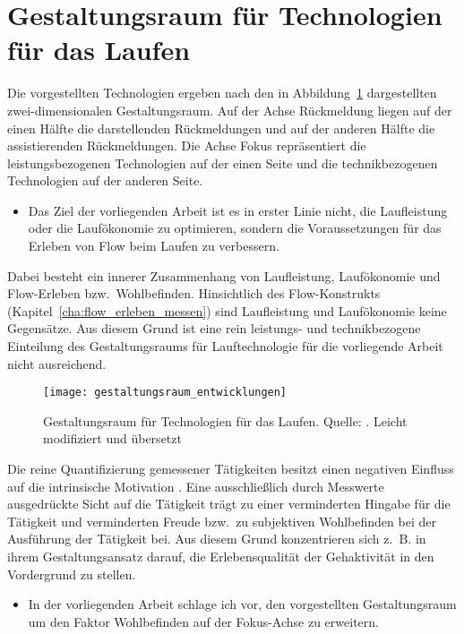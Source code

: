 

\section{Gestaltungsraum für Technologien für das Laufen} 

\label{sec:gestaltungsraum_fur_technologien_fur_das_laufen}

Die vorgestellten Technologien ergeben nach \citet[][]{Jensen2014} den in Abbildung~\ref{fig:gestaltungsraum_entwicklungen} dargestellten zwei-dimensionalen Gestaltungsraum. Auf der Achse Rückmeldung liegen auf der einen Hälfte die darstellenden Rückmeldungen und auf der anderen Hälfte die assistierenden Rückmeldungen. Die Achse Fokus repräsentiert die leistungsbezogenen Technologien auf der einen Seite und die technikbezogenen Technologien auf der anderen Seite.
\begin{itemize}
	
	\item Das Ziel der vorliegenden Arbeit ist es in erster Linie nicht, die Laufleistung oder die Laufökonomie zu optimieren, sondern die Voraussetzungen für das Erleben von Flow beim Laufen zu verbessern.
\end{itemize}

Dabei besteht ein innerer Zusammenhang von Laufleistung, Laufökonomie und Flow-Erleben bzw.\ Wohlbefinden. Hinsichtlich des Flow-Konstrukts (Kapitel~\ref{cha:flow_erleben_messen}) sind Laufleistung und Laufökonomie keine Gegensätze. Aus diesem Grund ist eine rein leistungs- und technikbezogene Einteilung des Gestaltungsraums für Lauftechnologie für die vorliegende Arbeit nicht ausreichend.
\begin{figure}
	[!htb] \centering 
	\texttt{[image: gestaltungsraum\_entwicklungen]} \caption[Gestaltungsraum für Technologien für das Laufen]{Gestaltungsraum für Technologien für das Laufen. Quelle: \citet[][]{Jensen2014}. Leicht modifiziert und übersetzt}\label{fig:gestaltungsraum_entwicklungen} 
\end{figure}

Die reine Quantifizierung gemessener Tätigkeiten besitzt einen negativen Einfluss auf die intrinsische Motivation \citep[][]{Etkin2016}. Eine ausschließlich durch Messwerte ausgedrückte Sicht auf die Tätigkeit trägt zu einer verminderten Hingabe für die Tätigkeit und verminderten Freude bzw.\ zu subjektiven Wohlbefinden bei der Ausführung der Tätigkeit bei. Aus diesem Grund konzentrieren sich z.~B. \citet{Hajinejad2015} in ihrem Gestaltungsansatz darauf, die Erlebensqualität der Gehaktivität in den Vordergrund zu stellen.
\begin{itemize}
	
	\item In der vorliegenden Arbeit schlage ich vor, den vorgestellten Gestaltungsraum um den Faktor Wohlbefinden auf der Fokus-Achse zu erweitern.
\end{itemize}

